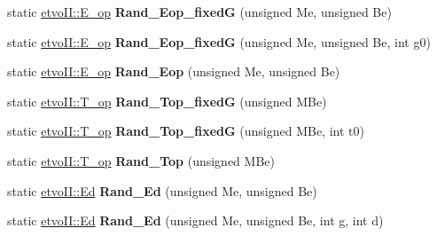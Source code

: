 \begin{DoxyCompactItemize}
static \mbox{\hyperlink{classetvo_i_i_1_1_e__op}{etvo\+I\+I\+::\+E\+\_\+op}} {\bfseries Rand\+\_\+\+Eop\+\_\+fixedG} (unsigned Me, unsigned Be)
\item 
\mbox{\label{classetvo_i_i_1_1rand_gen_aa7ad68ff6717ea680cde9bcd122121bf}} 
static \mbox{\hyperlink{classetvo_i_i_1_1_e__op}{etvo\+I\+I\+::\+E\+\_\+op}} {\bfseries Rand\+\_\+\+Eop\+\_\+fixedG} (unsigned Me, unsigned Be, int g0)
\item 
\mbox{\label{classetvo_i_i_1_1rand_gen_acec699b0a1f209940d36ff7c3d8fa869}} 
static \mbox{\hyperlink{classetvo_i_i_1_1_e__op}{etvo\+I\+I\+::\+E\+\_\+op}} {\bfseries Rand\+\_\+\+Eop} (unsigned Me, unsigned Be)
\item 
\mbox{\label{classetvo_i_i_1_1rand_gen_a56a94a200990e66c84fdc04397fd7c1b}} 
static \mbox{\hyperlink{classetvo_i_i_1_1_t__op}{etvo\+I\+I\+::\+T\+\_\+op}} {\bfseries Rand\+\_\+\+Top\+\_\+fixedG} (unsigned M\+Be)
\item 
\mbox{\label{classetvo_i_i_1_1rand_gen_ad3d9e1456541f914aa65a2b2ad51dfeb}} 
static \mbox{\hyperlink{classetvo_i_i_1_1_t__op}{etvo\+I\+I\+::\+T\+\_\+op}} {\bfseries Rand\+\_\+\+Top\+\_\+fixedG} (unsigned M\+Be, int t0)
\item 
\mbox{\label{classetvo_i_i_1_1rand_gen_aea3a14151abeca9252b2b8f61fbafb16}} 
static \mbox{\hyperlink{classetvo_i_i_1_1_t__op}{etvo\+I\+I\+::\+T\+\_\+op}} {\bfseries Rand\+\_\+\+Top} (unsigned M\+Be)
\item 
\mbox{\label{classetvo_i_i_1_1rand_gen_adae5598bf2555baff236ee0a79f188a2}} 
static \mbox{\hyperlink{classetvo_i_i_1_1_ed}{etvo\+I\+I\+::\+Ed}} {\bfseries Rand\+\_\+\+Ed} (unsigned Me, unsigned Be)
\item 
\mbox{\label{classetvo_i_i_1_1rand_gen_a8310b89d802701510e20287bc75ab544}} 
static \mbox{\hyperlink{classetvo_i_i_1_1_ed}{etvo\+I\+I\+::\+Ed}} {\bfseries Rand\+\_\+\+Ed} (unsigned Me, unsigned Be, int g, int d)
\item 
\mbox{\label{classetvo_i_i_1_1rand_gen_ae89919ba9d282c6e9017ff12201f5be8}} 

\end{DoxyCompactItemize}
